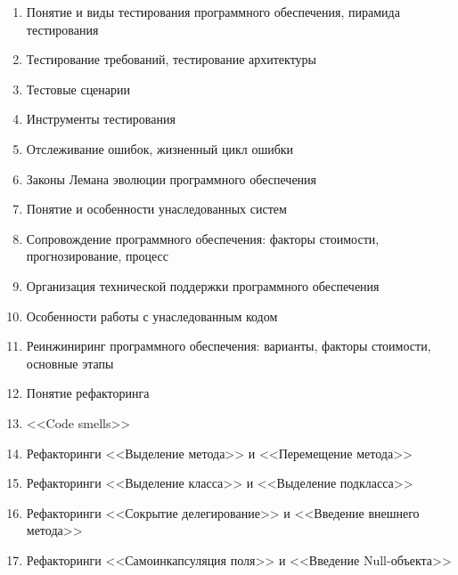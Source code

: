 \documentclass[a5paper]{article}
\begin{document}
\begin{enumerate}
    \item Понятие и виды тестирования программного обеспечения, пирамида тестирования
    \item Тестирование требований, тестирование архитектуры
    \item Тестовые сценарии
    \item Инструменты тестирования
    \item Отслеживание ошибок, жизненный цикл ошибки
    \item Законы Лемана эволюции программного обеспечения
    \item Понятие и особенности унаследованных систем
    \item Сопровождение программного обеспечения: факторы стоимости, прогнозирование, процесс
    \item Организация технической поддержки программного обеспечения
    \item Особенности работы с унаследованным кодом
    \item Реинжиниринг программного обеспечения: варианты, факторы стоимости, основные этапы
    \item Понятие рефакторинга
    \item <<Code smells>>
    \item Рефакторинги <<Выделение метода>> и <<Перемещение метода>>
    \item Рефакторинги <<Выделение класса>> и <<Выделение подкласса>>
    \item Рефакторинги <<Сокрытие делегирование>> и <<Введение внешнего метода>>
    \item Рефакторинги <<Самоинкапсуляция поля>> и <<Введение Null-объекта>>

\end{enumerate}
\end{document}
